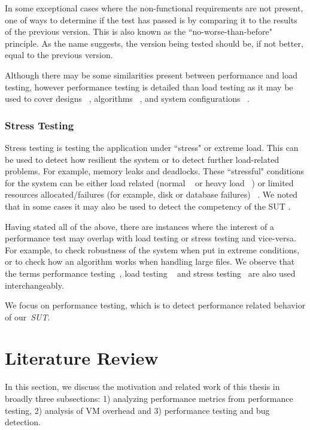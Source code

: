 In some exceptional cases where the non-functional requirements are not present, one of ways to determine if the test has passed is by comparing it to the results of the previous version. This is also known as the ``no-worse-than-before" principle. As the name suggests, the version being tested should be, if not better, equal to the previous version.~\cite{Dumke:2001}

Although there may be some similarities present between performance and load testing, however performance testing is detailed than load testing as it may be used to cover designs ~\cite{csurgay1999performance,denaro2004early,denaro2005performance}, algorithms ~\cite{cangussu2009segment,cangussu2007reducing}, and system configurations ~\cite{hoskins2005software,pozin2011models,sopitkamol2005method}. 

\subsubsection{Stress Testing}

Stress testing is testing the application under ``stress" or extreme load. This can be used to detect how resilient the system or to detect further load-related problems. For example, memory leaks and deadlocks. These ``stressful" conditions for the system can be either load related (normal ~\cite{zhang2002automated,kalita2011investigation,chakravarty2010stress} or heavy load ~\cite{Dillenseger2009,kalita2011investigation,huebner2001performance}) or limited resources allocated/failures (for example, disk or database failures) ~\cite{acharya2009mining}. We noted that in some cases it may also be used to detect the competency of the SUT \cite{garousi2010genetic,garousi2008empirical,garousi2006traffic,garousi2008traffic}.


Having stated all of the above, there are instances where the interest of a performance test may overlap with load testing or stress testing and vice-versa. For example, to check robustness of the system when put in extreme conditions, or to check how an algorithm works when handling large files. We observe that the terms performance testing~\cite{Dillenseger2009,Menasce02loadtesting,Menasce:2002}, load testing ~\cite{536461,Bayan:2008,perf_load_stress,perf_web} and stress testing~\cite{Bayan:2008,Yang:1996,4020172} are also used interchangeably. 

We focus on performance testing, which is to detect performance related behavior of our~\textit{SUT}.


\section{Literature Review}
\label{sec:related}
In this section, we discuss the motivation and related work of this thesis in broadly three subsections: 1) analyzing performance metrics from performance testing, 2) analysis of VM overhead and 3) performance testing and bug detection.


